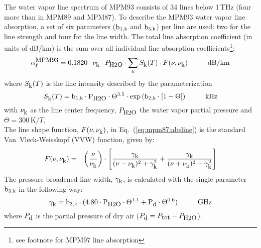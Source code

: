 \label{levele:mpm93_h2olines}
The water vapor line spectrum of MPM93 \cite{liebeetal:93} 
consists of 34 lines below 1\,THz (four more than in MPM89 and MPM87). 
To describe the MPM93 water vapor line absorption, a set of six parameters 
($\rm b_{\rm 1,k}$ and $\rm b_{\rm 3,k}$) per line are used: two for the line strength and 
four for the line width. The total line absorption coefficient 
(in units of dB/km) is the sum over all individual line absorption 
coefficients\footnote{see footnote for MPM97 line absorption}:
\begin{equation}
  \label{eq:mpm93:absline}
  \alphampmnl = 0.1820 \cdot \nuk \cdot \phzo \cdot 
  \sum_{k}{\inten \cdot \shape}\hspace*{10mm}\mbox{dB/km}
\end{equation}
where $S_{\mbox{\rm \small k}}(T)$ is the line intensity described by the parameterization
\begin{equation}
  \label{eq:mpm93:strength}
  \inten = \bek \cdot \phzo \cdot \Theta^{3.5} 
           \cdot \exp{(\bzk \cdot [1-\Theta])}\hspace*{10mm}\mbox{kHz}
\end{equation}
with $\nu_{\mbox{\rm \small k}}$ as the line center frequency, $P_{\mbox{\rm \small H2O}}$ the water
vapor partial pressure and $\Theta = 300\,\mbox{K}/T$.\\
The line shape function, $F(\nu,\nu_{\mbox{\rm \small k}})$, in Eq.~(\ref{eq:mpm87:absline}) 
is the standard Van~Vleck-Weisskopf (VVW) function, given by:
\begin{eqnarray}
  \label{eq:mpm93:VVW}
  F(\nu,\nu_{\mbox{\rm \small k}}) & = & \left(\frac{\nu}{\nu_{\mbox{\rm \small k}}}\right) \cdot 
               \left[\frac{\gamma_{\mbox{\rm \small k}}}{(\nu - \nu_{\mbox{\rm \small k}})^2 + \gamma_{\mbox{\rm \small k}}^2} + 
                     \frac{\gamma_{\mbox{\rm \small k}}}{(\nu + \nu_{\mbox{\rm \small k}})^2 + \gamma_{\mbox{\rm \small k}}^2}\right]\\
\end{eqnarray}
The pressure broadened line width, $\gamma_{\mbox{\rm \small k}}$, is calculated with the 
single parameter $\rm b_{\rm 3,k}$ in the following way:
\begin{equation}
  \label{eq:mpm93:gamma}
  \gamk = \bdk \cdot 
          (4.80 \cdot \phzo \cdot \Theta^{1.1} + \pda \cdot
          \Theta^{0.6})\hspace*{10mm}\mbox{GHz}
\end{equation}
where $P_{\mbox{\rm \small d}}$ is the partial pressure of dry air ($P_{\mbox{\rm \small d}}=P_{\mbox{\rm \small tot}}-P_{\mbox{\rm \small H2O}}$). 


